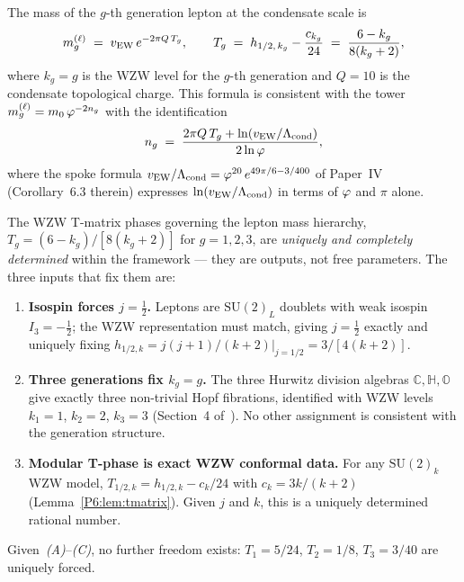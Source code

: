 \begin{theorem}
\label{P6:thm:wzw_connection}
The mass of the $g$-th generation lepton at the condensate scale is
\begin{equation}
  m_g^{(\ell)} \;=\; v_{\mathrm{EW}}\,e^{-2\pi Q\,T_g},
  \qquad
  T_g \;=\; h_{1/2,\,k_g} - \frac{c_{k_g}}{24}
  \;=\; \frac{6-k_g}{8(k_g+2)},
  \label{P6:eq:lepton_mass_tower}
\end{equation}
where $k_g = g$ is the WZW level for the $g$-th generation and
$Q = 10$ is the condensate topological charge.
This formula is consistent with the tower $m_g^{(\ell)} = m_0\,\varphi^{-2n_g}$
with the identification
\begin{equation}
  n_g \;=\; \frac{2\pi Q\,T_g + \ln(v_{\mathrm{EW}}/\Lambda_{\mathrm{cond}})}{2\ln\varphi},
  \label{P6:eq:tower_level_g}
\end{equation}
where the spoke formula $v_{\mathrm{EW}}/\Lambda_{\mathrm{cond}} = \varphi^{20}\,e^{49\pi/6 - 3/400}$
of Paper~IV~\cite{Paper4} (Corollary~6.3 therein) expresses
$\ln(v_{\mathrm{EW}}/\Lambda_{\mathrm{cond}})$ in terms of $\varphi$ and $\pi$ alone.
\end{theorem}

\begin{theorem}
\label{P6:thm:tphase_unique}
The WZW T-matrix phases governing the lepton mass hierarchy,
$T_g = (6-k_g)/[8(k_g+2)]$ for $g=1,2,3$,
are \emph{uniquely and completely determined} within the framework ---
they are outputs, not free parameters.
The three inputs that fix them are:
\begin{enumerate}[noitemsep,label=\emph{(\Alph*)}]
\item \textbf{Isospin forces $j=\tfrac{1}{2}$.}
  Leptons are $\mathrm{SU}(2)_L$ doublets with weak isospin $I_3=-\tfrac{1}{2}$;
  the WZW representation must match, giving $j=\tfrac{1}{2}$ exactly and
  uniquely fixing $h_{1/2,k} = j(j+1)/(k+2)|_{j=1/2} = 3/[4(k+2)]$.
\item \textbf{Three generations fix $k_g = g$.}
  The three Hurwitz division algebras $\mathbb{C},\mathbb{H},\mathbb{O}$
  give exactly three non-trivial Hopf fibrations, identified with WZW levels
  $k_1=1$, $k_2=2$, $k_3=3$ (Section~4 of~\cite{Paper1}).
  No other assignment is consistent with the generation structure.
\item \textbf{Modular T-phase is exact WZW conformal data.}
  For any $\mathrm{SU}(2)_k$ WZW model, $T_{1/2,k} = h_{1/2,k} - c_k/24$
  with $c_k = 3k/(k+2)$ (Lemma~\ref{P6:lem:tmatrix}).
  Given $j$ and $k$, this is a uniquely determined rational number.
\end{enumerate}
Given~\emph{(A)}--\emph{(C)}, no further freedom exists:
$T_1 = 5/24$, $T_2 = 1/8$, $T_3 = 3/40$ are uniquely forced.
\end{theorem}

